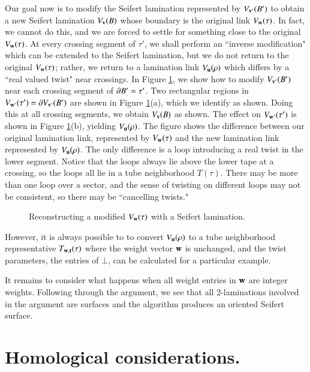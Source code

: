 \documentclass[12pt]{article}
\theoremstyle{remark}
\begin{document}
 Our goal now is to modify the Seifert lamination represented by $V_{{\bf v}'}(B')$ to obtain a new Seifert lamination $V_{{\bf v}}(B)$ whose boundary is the original link $V_{\bf w}(\tau)$.   In fact, we cannot do this, and we are forced to settle for something close to the original $V_{\bf w}(\tau)$.    At every crossing segment of $\tau'$, we shall perform an ``inverse modification" which can be extended to the Seifert lamination, but we do not return to the original $V_{\bf w}(\tau)$; rather, we return to a lamination link $V_{\bf u}(\rho)$ which differs by a ``real valued twist" near crossings.   In Figure \ref{Reconstruct}, we show how to modify $V_{{\bf v}'}(B')$ near each crossing segment of $\partial B' =\tau'$.  Two rectangular regions in $V_{{\bf w}'}(\tau')=\partial V_{{\bf v}'}(B')$ are shown in Figure \ref{Reconstruct}(a), which we identify as shown.   Doing this at all crossing segments, we obtain  $V_{{\bf v}}(B)$ as shown.  The effect on $V_{{\bf w}'}(\tau')$ is shown in Figure \ref{Reconstruct}(b), yielding $V_{\bf u}(\rho)$.   The figure shows the difference between our original lamination link, represented by $V_{\bf w}(\tau)$ and the new lamination link represented by $V_{\bf u}(\rho)$.   The only difference is a loop introducing a real twist in the lower segment.  Notice that the loops always lie above the lower tape at a crossing, so the loops all lie in a tube neighborhood $T(\tau)$.   There may be more than one loop  over a sector, and the sense of twisting on different loops may not be consistent, so there may be ``cancelling twists." 


\begin{figure}[H]
\centering
{}
\caption{\footnotesize Reconstructing a modified $V_{\bf w}(\tau)$ with a Seifert lamination.}
\label{Reconstruct}
\end{figure}


However, it is always possible to to convert $V_{\bf u}(\rho)$ to a tube neighborhood representative $T_{{\bf w},{\bf t}}(\tau)$ where the weight vector ${\bf w}$ is unchanged, and the twist parameters, the entries of $\bot$, can be calculated for a particular example.

It remains to consider what happens when all weight entries in ${\bf w}$ are integer weights.  Following through the argument, we see that all 2-laminations involved in the argument are surfaces and the algorithm produces an oriented Seifert surface.

\section {Homological considerations.}\label{Homology}
\end{document}
